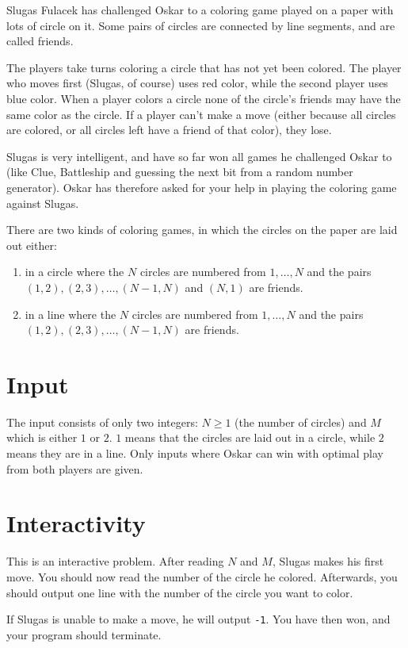 Slugas Fulacek has challenged Oskar to a coloring game played on a paper with lots of circle on it.
Some pairs of circles are connected by line segments, and are called friends.

The players take turns coloring a circle that has not yet been colored.
The player who moves first (Slugas, of course) uses red color, while the second player uses blue color.
When a player colors a circle none of the circle's friends may have the same color as the circle.
If a player can't make a move (either because all circles are colored, or all circles left have a friend of that color), they lose.

Slugas is very intelligent, and have so far won all games he challenged Oskar to (like Clue, Battleship and guessing the next bit from a random number generator).
Oskar has therefore asked for your help in playing the coloring game against Slugas.

There are two kinds of coloring games, in which the circles on the paper are laid out either:
\begin{enumerate}
    \item in a circle where the $N$ circles are numbered from $1, \dots, N$ and the pairs $(1, 2), (2, 3), \dots, (N-1, N)$ and $(N, 1)$ are friends.
    \item in a line where the $N$ circles are numbered from $1, \dots, N$ and the pairs $(1, 2), (2, 3), \dots, (N-1, N)$ are friends.
\end{enumerate}

\section*{Input}
The input consists of only two integers: $N \ge 1$ (the number of circles) and $M$ which is either $1$ or $2$.
$1$ means that the circles are laid out in a circle, while $2$ means they are in a line.
Only inputs where Oskar can win with optimal play from both players are given.

\section*{Interactivity}
This is an interactive problem.
After reading $N$ and $M$, Slugas makes his first move.
You should now read the number of the circle he colored.
Afterwards, you should output one line with the number of the circle you want to color.

If Slugas is unable to make a move, he will output \texttt{-1}.
You have then won, and your program should terminate.

